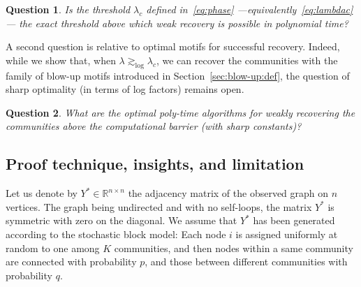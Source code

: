 \documentclass[final]{colt2026}
\newcommand{\1}{\mathbf{1}}
\newtheorem{question}{Question}
\newcommand{\bbR}{\mathbb{R}}
\newcommand{\pa}[1]{\left(#1\right)}
\newcommand{\ac}[1]{\left\{#1\right\}}
\begin{document}
\begin{question}\label{Q1}
Is the threshold $\lambda_{c}$ defined in~\eqref{eq:phase} ---equivalently~\eqref{eq:lambdac}--- the \emph{exact} threshold above which weak recovery is possible in polynomial time?
\end{question}


A second question is relative to optimal motifs for successful recovery. Indeed, while we show that, when $\lambda\gtrsim_{\log} \lambda_{c}$,  we can recover the communities with the family of blow-up  motifs introduced in Section~\ref{sec:blow-up:def}, the question of sharp optimality (in terms of  log factors) remains open. 

\begin{question}\label{Q2}
What are the optimal poly-time algorithms for weakly recovering the communities above the computational barrier (with sharp constants)?
\end{question}








\subsection{Proof technique, insights, and limitation}\label{sec:overview}
Let us denote by $Y^{*}\in\bbR^{n\times n}$ the adjacency matrix of the observed graph on $n$ vertices.
The graph being undirected and with no self-loops, the matrix $Y^*$ is symmetric with zero on the diagonal. We assume that $Y^*$ has been generated according to the stochastic block model: Each node $i$ is assigned uniformly at random to one among $K$ communities, and then nodes within a same community are connected with probability $p$, and those between different communities with probability $q$.
\end{document}
